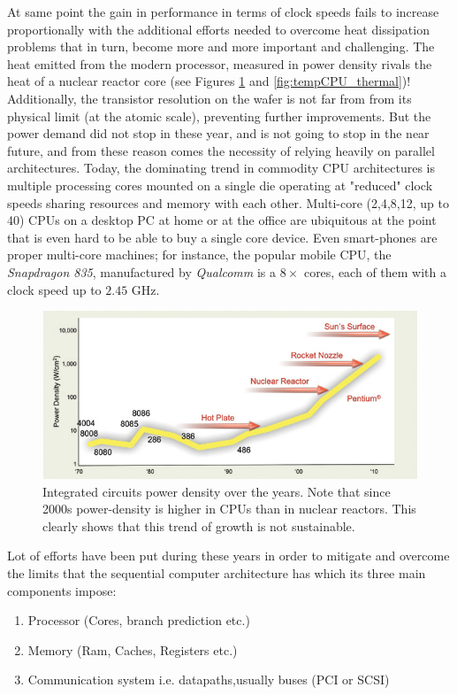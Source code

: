 At same point the gain in performance in terms of clock speeds fails to increase proportionally with the additional efforts needed to overcome heat dissipation problems that in turn, become more and more important and challenging.
The heat emitted from the modern processor, measured in power density rivals the heat of a nuclear reactor core (see Figures \ref{fig:tempCPU} and \ref{fig:tempCPU_thermal})!
Additionally, the transistor resolution on the wafer is not far from from its physical limit (at the atomic scale), preventing further improvements.
But the power demand did not stop in these year, and is not going to stop in the near future, and from these reason comes the necessity of relying heavily on parallel architectures.
Today, the dominating trend in commodity CPU architectures is multiple processing cores mounted on a single die operating at "reduced" clock speeds  sharing resources and memory with each other.
Multi-core (2,4,8,12, up to 40) CPUs on a desktop PC at home or at the office are ubiquitous at the point that is even hard to be able to buy a single core device.
Even smart-phones are proper multi-core machines; for instance, the popular mobile CPU, the \textit{Snapdragon 835}, manufactured by \textit{Qualcomm} is a $8 \times$ cores, each of them with a clock speed up to $2.45$ \si{GHz}.
\begin{figure}[!htbp]
\centering
\includegraphics[width=1.0\textwidth]{./images/parallel_programming/temperatureCPU}
\caption[Temperature density of CPUs over the years.]{Integrated circuits power density over the years. Note  that since 2000s power-density is higher in CPUs than in nuclear reactors. This clearly shows that this trend of growth is not sustainable.}
\label{fig:tempCPU}
\end{figure}
Lot of efforts have been put during these years in order to mitigate and overcome the limits that the sequential computer architecture has which its three main components impose:
\begin{enumerate}
\item Processor (Cores, branch prediction etc.)
\item Memory (Ram, Caches, Registers etc.)
\item Communication system i.e. datapaths,usually buses (PCI or SCSI)
\end{enumerate}

